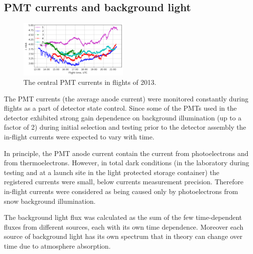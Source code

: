 \documentclass[final,5p,times,twocolumn]{elsarticle}
\begin{document}
\subsection{PMT currents and background light}

\begin{figure}[tb]
    \includegraphics[width=0.48\textwidth]{figs/cur2013_PMT1.pdf}
    \caption{The central PMT currents in flights of 2013.}
\label{fig:current}
\end{figure}

The PMT currents (the average anode current) were monitored constantly during flights as a part of detector state control. Since some of the PMTs used in the detector exhibited strong gain dependence on background illumination (up to a factor of 2) during initial selection and testing prior to the detector assembly the in-flight currents were expected to vary with time.

In principle, the PMT anode current contain the current from photoelectrons and from thermoelectrons. However, in total dark conditions (in the laboratory during testing and at a launch site in the light protected storage container) the registered currents were small, below currents measurement precision. Therefore in-flight currents were considered as being caused only by photoelectrons from snow background illumination.

The background light flux was calculated as the sum of the few time-dependent fluxes from different sources, each with its own time dependence. Moreover each source of background light has its own spectrum that in theory can change over time due to atmosphere absorption.
\end{document}
